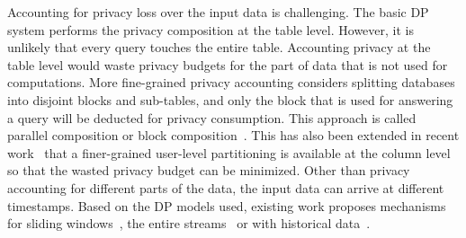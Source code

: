 Accounting for privacy loss over the input data is challenging.
The basic DP system performs the privacy composition at the table level.
However, it is unlikely that every query touches the entire table.
Accounting privacy at the table level would waste privacy budgets for the part of data that is not used for computations.
More fine-grained privacy accounting considers splitting databases into disjoint blocks and sub-tables, and only the block that is used for answering a query will be deducted for privacy consumption.
This approach is called parallel composition or block composition~\cite{mcsherry2009pinq,LecuyerSVG019sage}.
This has also been extended in recent work~\cite{nicolas2023cohere} that a finer-grained user-level partitioning is available at the column level so that the wasted privacy budget can be minimized.
Other than privacy accounting for different parts of the data, the input data can arrive at different timestamps.
Based on the DP models used, existing work proposes mechanisms for sliding windows~\cite{kellaris2014differentially}, the entire streams~\cite{DworkNPRY10panprivate,dong2024continual,DongLY23continual} or with historical data~\cite{growingdb18}.




